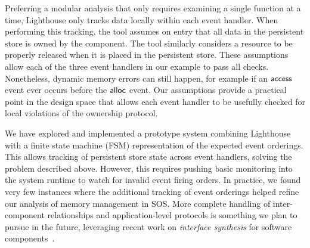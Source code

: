 Preferring a modular analysis that only requires examining a single function
at a time, Lighthouse only tracks data locally within each event handler.  
%
When performing this tracking, the tool assumes on entry that all data in the
persistent store is owned by the component.
%
The tool similarly considers a resource to be properly released when it is
placed in the persistent store.  
%
These assumptions allow each of the three event handlers in our example to
pass all checks.  
%
Nonetheless, dynamic memory errors can still happen, for example if an
${\mathsf{access}}$ event ever occurs before the ${\mathsf{alloc}}$ event.  
%
Our assumptions provide a practical point in the design space that allows each
event handler to be usefully checked for local violations of the ownership
protocol.  



We have explored and implemented a prototype system combining Lighthouse with
a finite state machine (FSM) representation of the expected event orderings.
%
This allows tracking of persistent store state across event handlers, solving
the problem described above.
%
However, this requires pushing basic monitoring into the system runtime to
watch for invalid event firing orders.
%
In practice, we found very few instances where the additional tracking of event
orderings helped refine our analysis of memory management in SOS.
%
More complete handling of inter-component relationships and application-level
protocols is something we plan to pursue in the future, leveraging recent work
on {\em interface synthesis} for software components~\cite{AlurPOPL05,HJM05}.

